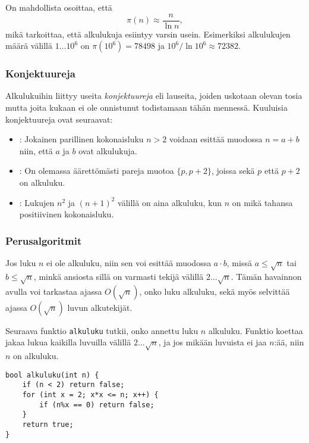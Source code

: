 On mahdollista osoittaa, että
\[\pi(n) \approx \frac{n}{\ln n},\]
mikä tarkoittaa, että alkulukuja esiintyy
varsin usein. Esimerkiksi alkulukujen määrä
välillä $1 \ldots 10^6$ on $\pi(10^6)=78498$
ja $10^6 / \ln 10^6 \approx 72382$.

\subsubsection{Konjektuureja}

Alkulukuihin liittyy useita \emph{konjektuureja}
eli lauseita, joiden uskotaan olevan tosia mutta
joita kukaan ei ole onnistunut todistamaan tähän mennessä.
Kuuluisia konjektuureja ovat seuraavat:

\begin{itemize}
\item {}:
Jokainen parillinen kokonaisluku $n>2$ voidaan esittää
muodossa $n=a+b$ niin, että $a$ ja $b$
ovat alkulukuja.
\item {}:
On olemassa äärettömästi pareja muotoa $\{p,p+2\}$,
joissa sekä $p$ että $p+2$ on alkuluku.
\item {}:
Lukujen $n^2$ ja $(n+1)^2$ välillä on aina alkuluku,
kun $n$ on mikä tahansa positiivinen kokonaisluku.
\end{itemize}

\subsubsection{Perusalgoritmit}

Jos luku $n$ ei ole alkuluku,
niin sen voi esittää muodossa $a \cdot b$,
missä $a \le \sqrt n$ tai $b \le \sqrt n$,
minkä ansiosta sillä on varmasti
tekijä välillä $2 \ldots \sqrt n$.
Tämän havainnon avulla voi tarkastaa ajassa $O(\sqrt n)$,
onko luku alkuluku,
sekä myös selvittää ajassa $O(\sqrt n)$
luvun alkutekijät.

Seuraava funktio \texttt{alkuluku} tutkii,
onko annettu luku $n$ alkuluku.
Funktio koettaa jakaa lukua kaikilla luvuilla
välillä $2 \ldots \sqrt n$, ja jos mikään
luvuista ei jaa $n$:ää, niin $n$ on alkuluku.

\begin{lstlisting}
bool alkuluku(int n) {
    if (n < 2) return false;
    for (int x = 2; x*x <= n; x++) {
        if (n%x == 0) return false;
    }
    return true;
}
\end{lstlisting}

